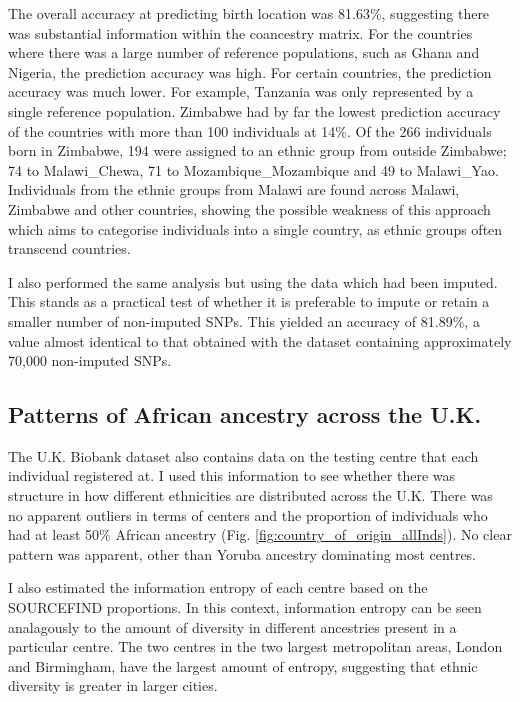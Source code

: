 The overall accuracy at predicting birth location was 81.63\%, suggesting there was substantial information within the coancestry matrix. For the countries where there was a large number of reference populations, such as Ghana and Nigeria, the prediction accuracy was high. For certain countries, the prediction accuracy was much lower. For example, Tanzania was only represented by a single reference population. Zimbabwe had by far the lowest prediction accuracy of the countries with more than 100 individuals at 14\%. Of the 266 individuals born in Zimbabwe, 194 were assigned to an ethnic group from outside Zimbabwe; 74 to Malawi\_Chewa, 71 to Mozambique\_Mozambique and 49 to Malawi\_Yao. Individuals from the ethnic groups from Malawi are found across Malawi, Zimbabwe and other countries, showing the possible weakness of this approach which aims to categorise individuals into a single country, as ethnic groups often transcend countries. 

I also performed the same analysis but using the data which had been imputed. This stands as a practical test of whether it is preferable to impute or retain a smaller number of non-imputed SNPs. This yielded an accuracy of 81.89\%, a value almost identical to that obtained with the dataset containing approximately 70,000 non-imputed SNPs. 


\subsection{Patterns of African ancestry across the U.K.}

The U.K. Biobank dataset also contains data on the testing centre that each individual registered at. I used this information to see whether there was structure in how different ethnicities are distributed across the U.K. There was no apparent outliers in terms of centers and the proportion of individuals who had at least 50\% African ancestry (Fig. \ref{fig:country_of_origin_allInds}). No clear pattern was apparent, other than Yoruba ancestry dominating most centres. 
 
I also estimated the information entropy of each centre based on the SOURCEFIND proportions. In this context, information entropy can be seen analagously to the amount of diversity in different ancestries present in a particular centre. The two centres in the two largest metropolitan areas, London and Birmingham, have the largest amount of entropy, suggesting that ethnic diversity is greater in larger cities.

